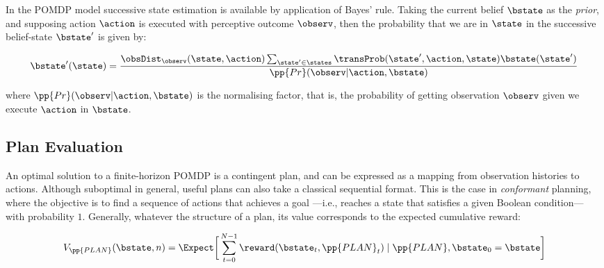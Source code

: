 In the POMDP model successive state estimation is available by
application of Bayes' rule.  Taking the current belief $\bstate$ as
the {\em prior}, and supposing action $\action$ is executed with
perceptive outcome $\observ$, then the probability that we are in
$\state$ in the successive belief-state $\bstate'$ is given by:

\begin{equation}\label{eq:revision}
\bstate'(\state) = \frac{\obsDist_\observ(\state, \action)
  \sum_{\state'\in \states} \transProb(\state', \action, \state) \bstate(\state') }{\pp{Pr}(\observ | \action, \bstate)}
\end{equation}

\noindent where $\pp{Pr}(\observ | \action, \bstate)$ is the
normalising factor, that is, the probability of getting observation
$\observ$ given we execute $\action$ in $\bstate$.

\subsection{Plan Evaluation}

An optimal solution to a finite-horizon POMDP is a contingent plan,
and can be expressed as a mapping from observation histories to
actions. Although suboptimal in general, useful plans can also take a
classical sequential format. This is the case in {\em conformant}
planning, where the objective is to find a sequence of actions that
achieves a goal ---i.e., reaches a state that satisfies a given
Boolean condition--- with probability $1$.  Generally, whatever the
structure of a plan, its value corresponds to the expected cumulative
reward:


\begin{equation}\label{eq:expectedvalue}
V_{\pp{PLAN}}(\bstate, n) = \Expect \bigg{[} 
\sum_{t=0}^{N-1}  \reward(\bstate_t, \pp{PLAN}_t) \mid \pp{PLAN}, \bstate_0 = \bstate \bigg{]}
\end{equation}

